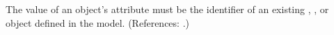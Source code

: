 The value of an \AssignmentRule object's  attribute must be
the identifier of an existing \Compartment, \Species, \Parameter or
\SpeciesReference object defined in the model.  (References: .)
